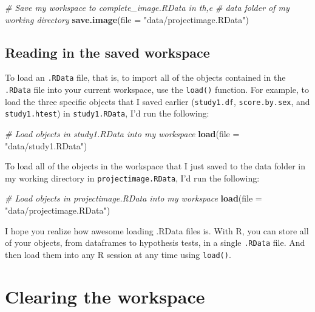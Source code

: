 \documentclass[
]{book}
\newenvironment{Shaded}{\begin{snugshade}}{\end{snugshade}}
\newcommand{\CommentTok}[1]{\textcolor[rgb]{0.56,0.35,0.01}{\textit{#1}}}
\newcommand{\DataTypeTok}[1]{\textcolor[rgb]{0.13,0.29,0.53}{#1}}
\newcommand{\KeywordTok}[1]{\textcolor[rgb]{0.13,0.29,0.53}{\textbf{#1}}}
\newcommand{\NormalTok}[1]{#1}
\newcommand{\StringTok}[1]{\textcolor[rgb]{0.31,0.60,0.02}{#1}}
\begin{document}
\begin{Shaded}
\begin{Highlighting}[]
\CommentTok{# Save my workspace to complete_image.RData in th,e}
\CommentTok{#  data folder of my working directory}
\KeywordTok{save.image}\NormalTok{(}\DataTypeTok{file =} \StringTok{"data/projectimage.RData"}\NormalTok{)}
\end{Highlighting}
\end{Shaded}

\hypertarget{reading-in-the-saved-workspace}{%
\subsection{Reading in the saved workspace}\label{reading-in-the-saved-workspace}}

To load an \texttt{.RData} file, that is, to import all of the objects contained in the \texttt{.RData} file into your current workspace, use the \texttt{load()} function. For example, to load the three specific objects that I saved earlier (\texttt{study1.df}, \texttt{score.by.sex}, and \texttt{study1.htest}) in \texttt{study1.RData}, I'd run the following:

\begin{Shaded}
\begin{Highlighting}[]
\CommentTok{# Load objects in study1.RData into my workspace}
\KeywordTok{load}\NormalTok{(}\DataTypeTok{file =} \StringTok{"data/study1.RData"}\NormalTok{)}
\end{Highlighting}
\end{Shaded}

To load all of the objects in the workspace that I just saved to the data folder in my working directory in \texttt{projectimage.RData}, I'd run the following:

\begin{Shaded}
\begin{Highlighting}[]
\CommentTok{# Load objects in projectimage.RData into my workspace}
\KeywordTok{load}\NormalTok{(}\DataTypeTok{file =} \StringTok{"data/projectimage.RData"}\NormalTok{)}
\end{Highlighting}
\end{Shaded}

I hope you realize how awesome loading .RData files is. With R, you can store all of your objects, from dataframes to hypothesis tests, in a single \texttt{.RData} file. And then load them into any R session at any time using \texttt{load()}.

\hypertarget{clearing-the-workspace}{%
\section{Clearing the workspace}\label{clearing-the-workspace}}
\end{document}
